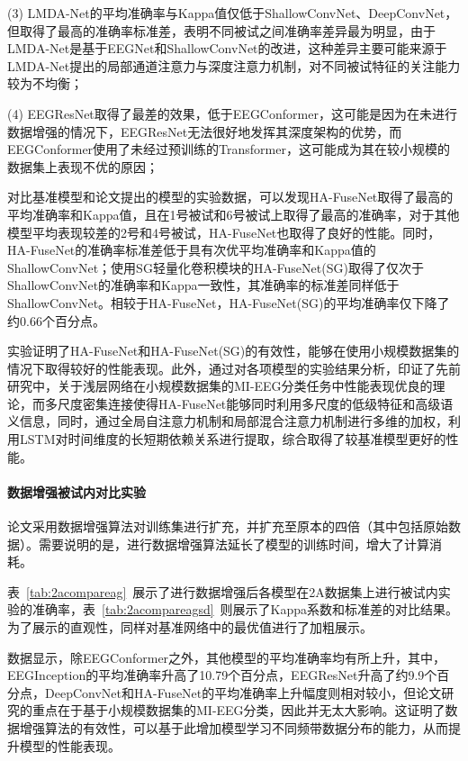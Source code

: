 (3) LMDA-Net的平均准确率与Kappa值仅低于ShallowConvNet、DeepConvNet，但取得了最高的准确率标准差，表明不同被试之间准确率差异最为明显，由于LMDA-Net是基于EEGNet和ShallowConvNet的改进，这种差异主要可能来源于LMDA-Net提出的局部通道注意力与深度注意力机制，对不同被试特征的关注能力较为不均衡；

(4) EEGResNet取得了最差的效果，低于EEGConformer，这可能是因为在未进行数据增强的情况下，EEGResNet无法很好地发挥其深度架构的优势，而EEGConformer使用了未经过预训练的Transformer，这可能成为其在较小规模的数据集上表现不优的原因；

对比基准模型和论文提出的模型的实验数据，可以发现HA-FuseNet取得了最高的平均准确率和Kappa值，且在1号被试和6号被试上取得了最高的准确率，对于其他模型平均表现较差的2号和4号被试，HA-FuseNet也取得了良好的性能。同时，HA-FuseNet的准确率标准差低于具有次优平均准确率和Kappa值的ShallowConvNet；使用SG轻量化卷积模块的HA-FuseNet(SG)取得了仅次于ShallowConvNet的准确率和Kappa一致性，其准确率的标准差同样低于ShallowConvNet。相较于HA-FuseNet，HA-FuseNet(SG)的平均准确率仅下降了约0.66个百分点。

实验证明了HA-FuseNet和HA-FuseNet(SG)的有效性，能够在使用小规模数据集的情况下取得较好的性能表现。此外，通过对各项模型的实验结果分析，印证了先前研究中，关于浅层网络在小规模数据集的MI-EEG分类任务中性能表现优良的理论，而多尺度密集连接使得HA-FuseNet能够同时利用多尺度的低级特征和高级语义信息，同时，通过全局自注意力机制和局部混合注意力机制进行多维的加权，利用LSTM对时间维度的长短期依赖关系进行提取，综合取得了较基准模型更好的性能。

\paragraph{数据增强被试内对比实验}

论文采用数据增强算法对训练集进行扩充，并扩充至原本的四倍（其中包括原始数据）。需要说明的是，进行数据增强算法延长了模型的训练时间，增大了计算消耗。

表~\ref{tab:2acompareag}~展示了进行数据增强后各模型在2A数据集上进行被试内实验的准确率，表~\ref{tab:2acompareagsd}~则展示了Kappa系数和标准差的对比结果。为了展示的直观性，同样对基准网络中的最优值进行了加粗展示。

数据显示，除EEGConformer之外，其他模型的平均准确率均有所上升，其中，EEGInception的平均准确率升高了10.79个百分点，EEGResNet升高了约9.9个百分点，DeepConvNet和HA-FuseNet的平均准确率上升幅度则相对较小，但论文研究的重点在于基于小规模数据集的MI-EEG分类，因此并无太大影响。这证明了数据增强算法的有效性，可以基于此增加模型学习不同频带数据分布的能力，从而提升模型的性能表现。

